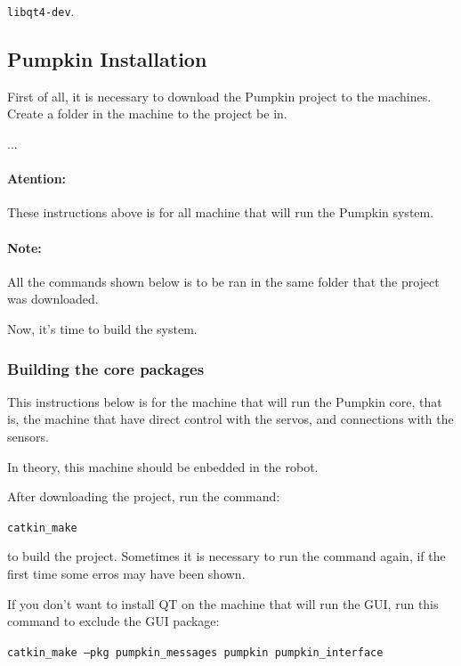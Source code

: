 \documentclass[oneside,a4paper,titlepage]{article}
\begin{document}
\begin{center}
\texttt{libqt4-dev}.
\end{center}

\subsection{Pumpkin Installation}

First of all, it is necessary to download the Pumpkin project to the machines. Create a folder in the machine to the project be in.

...

\paragraph{Atention: } These instructions above is for all machine that will run the Pumpkin system.

\paragraph{Note: } All the commands shown below is to be ran in the same folder that the project was downloaded.

Now, it's time to build the system.

\subsubsection{Building the core packages}

This instructions below is for the machine that will run the Pumpkin core, that is, the machine that have direct control with the servos, and connections with the sensors.

In theory, this machine should be enbedded in the robot.

After downloading the project, run the command:

\begin{center}
\texttt{catkin\_make}
\end{center}

to build the project. Sometimes it is necessary to run the command again, if the first time some erros may have been shown.

If you don't want to install QT on the machine that will run the GUI, run this command to exclude the GUI package:

\begin{center}
\texttt{catkin\_make --pkg pumpkin\_messages pumpkin pumpkin\_interface}
\end{center}
\end{document}

